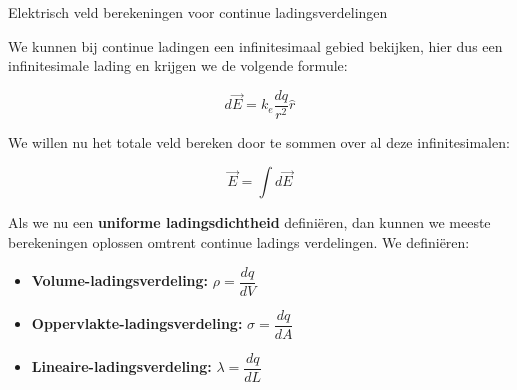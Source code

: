 \begin{app}{Elektrisch veld berekeningen voor continue ladingsverdelingen}

    We kunnen bij continue ladingen een infinitesimaal gebied bekijken, hier dus een infinitesimale lading en krijgen we de volgende formule:
    
    \begin{equation}
        d\Vec{E} = k_e \dfrac{dq}{r^2}\hat{r}
    \end{equation}
    
    \noindent We willen nu het totale veld bereken door te sommen over al deze infinitesimalen:
    
    \begin{equation}
        \Vec{E} = \int d\Vec{E}
    \end{equation}
    
    \noindent Als we nu een \textbf{uniforme ladingsdichtheid} definiëren, dan kunnen we meeste berekeningen oplossen omtrent continue ladings verdelingen. We definiëren:

    
    \begin{itemize}
        \item \textbf{Volume-ladingsverdeling:} $ \rho = \dfrac{dq}{dV} $
        \item \textbf{Oppervlakte-ladingsverdeling:} $ \sigma = \dfrac{dq}{dA} $
        \item \textbf{Lineaire-ladingsverdeling:} $ \lambda = \dfrac{dq}{dL} $
    \end{itemize}

    \vspace{-0.3cm}
    
\end{app}

\newpage

